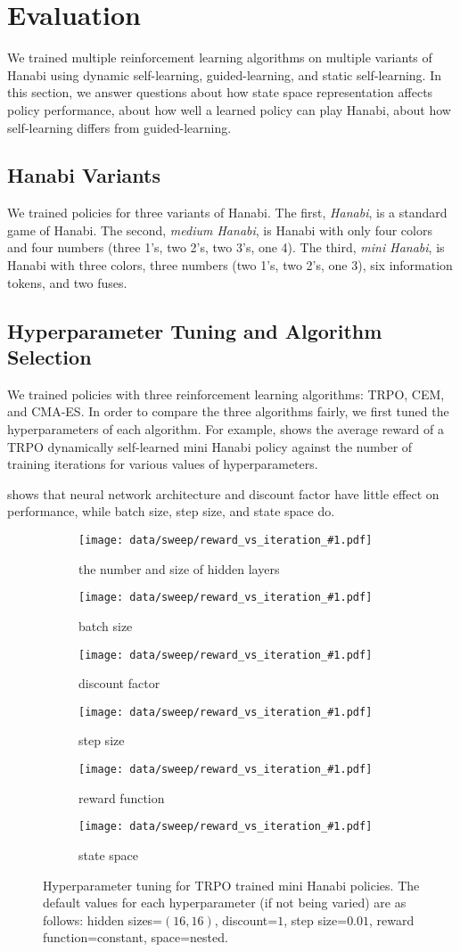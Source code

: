 \section{Evaluation}\label{sec:eval}

We trained multiple reinforcement learning algorithms on multiple variants of
Hanabi using dynamic self-learning, guided-learning, and static self-learning.
In this section, we answer questions about how state space representation
affects policy performance, about how well a learned policy can play Hanabi,
about how self-learning differs from guided-learning.

\subsection{Hanabi Variants}
We trained policies for three variants of Hanabi. The first, \emph{Hanabi}, is
a standard game of Hanabi. The second, \emph{medium Hanabi}, is Hanabi with
only four colors and four numbers (three 1's, two 2's, two 3's, one 4). The
third, \emph{mini Hanabi}, is Hanabi with three colors, three numbers (two 1's,
two 2's, one 3), six information tokens, and two fuses.

\subsection{Hyperparameter Tuning and Algorithm Selection}
We trained policies with three reinforcement learning algorithms: TRPO, CEM,
and CMA-ES. In order to compare the three algorithms fairly, we first tuned the
hyperparameters of each algorithm. For example,  shows the
average reward of a TRPO dynamically self-learned mini Hanabi policy against
the number of training iterations for various values of hyperparameters.

 shows that neural network architecture and discount factor
have little effect on performance, while batch size, step size, and state space
do.

\begin{figure}[ht]
  \newcommand{\hyperparamsubfig}[3]{%
    \begin{subfigure}[t]{0.32\textwidth}
      \centering
      \texttt{[image: data/sweep/reward\_vs\_iteration\_\#1.pdf]}
      \caption{#2}\label{fig:#3}
    \end{subfigure}
  }

  \centering

  \hyperparamsubfig{hidden_sizes}{the number and size of hidden layers}{}
  \hyperparamsubfig{batch_size}{batch size}{}
  \hyperparamsubfig{discount}{discount factor}{}

  \hyperparamsubfig{step_size}{step size}{}
  \hyperparamsubfig{reward}{reward function}{}
  \hyperparamsubfig{space}{state space}{}

  \caption{
    Hyperparameter tuning for TRPO trained mini Hanabi policies. The default
    values for each hyperparameter (if not being varied) are as follows: hidden
    sizes=$(16, 16)$, discount=$1$, step size=$0.01$, reward function=constant,
    space=nested.
  }\label{fig:trpo-tuning}
\end{figure}

